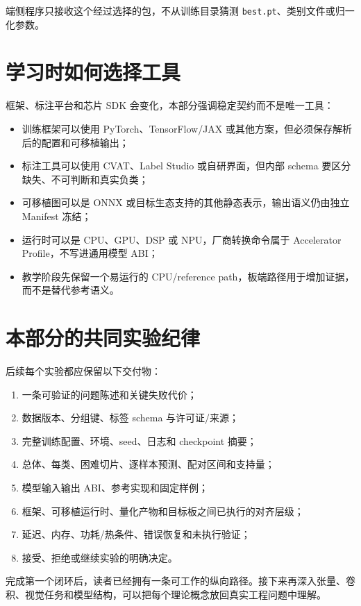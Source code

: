 端侧程序只接收这个经过选择的包，不从训练目录猜测 \texttt{best.pt}、类别文件或归一化参数。

\section{学习时如何选择工具}

框架、标注平台和芯片 SDK 会变化，本部分强调稳定契约而不是唯一工具：

\begin{itemize}
  \item 训练框架可以使用 PyTorch、TensorFlow/JAX 或其他方案，但必须保存解析后的配置和可移植输出；
  \item 标注工具可以使用 CVAT、Label Studio 或自研界面，但内部 schema 要区分缺失、不可判断和真实负类；
  \item 可移植图可以是 ONNX 或目标生态支持的其他静态表示，输出语义仍由独立 Manifest 冻结\cite{onnx-ir}；
  \item 运行时可以是 CPU、GPU、DSP 或 NPU，厂商转换命令属于 Accelerator Profile，不写进通用模型 ABI；
  \item 教学阶段先保留一个易运行的 CPU/reference path，板端路径用于增加证据，而不是替代参考语义。
\end{itemize}

\section{本部分的共同实验纪律}

后续每个实验都应保留以下交付物：

\begin{enumerate}
  \item 一条可验证的问题陈述和关键失败代价；
  \item 数据版本、分组键、标签 schema 与许可证/来源；
  \item 完整训练配置、环境、seed、日志和 checkpoint 摘要；
  \item 总体、每类、困难切片、逐样本预测、配对区间和支持量；
  \item 模型输入输出 ABI、参考实现和固定样例；
  \item 框架、可移植运行时、量化产物和目标板之间已执行的对齐层级；
  \item 延迟、内存、功耗/热条件、错误恢复和未执行验证；
  \item 接受、拒绝或继续实验的明确决定。
\end{enumerate}

完成第一个闭环后，读者已经拥有一条可工作的纵向路径。接下来再深入张量、卷积、视觉任务和模型结构，可以把每个理论概念放回真实工程问题中理解。
